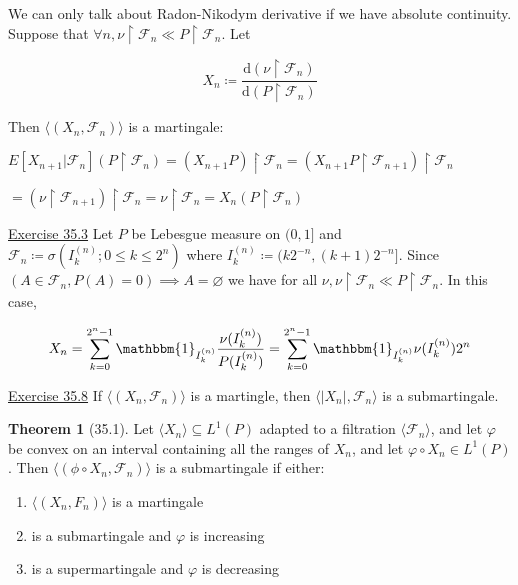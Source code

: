 \documentclass{article}
\theoremstyle{definition}
\newtheorem{theorem}{Theorem}
\begin{document}
We can only talk about Radon-Nikodym derivative if we have absolute continuity. Suppose that \(\forall n, \nu \upharpoonright \mathscr{F}_n \ll P\upharpoonright \mathscr{F}_n\). Let

\[
    X_n \coloneqq \frac{\mathrm{d} (\nu \upharpoonright \mathscr{F}_n)}{\mathrm{d}(P\upharpoonright \mathscr{F}_n)}
\]

Then \(\langle (X_n, \mathscr{F}_n) \rangle \)  is a martingale:

\(E[X_{n+1}|\mathscr{F}_n](P\upharpoonright \mathscr{F}_n)=(X_{n+1}P)\upharpoonright \mathscr{F}_n=(X_{n+1}P\upharpoonright \mathscr{F}_{n+1})\upharpoonright \mathscr{F}_n\) 

\(=(\nu\upharpoonright \mathscr{F}_{n+1})\upharpoonright \mathscr{F}_n = \nu\upharpoonright \mathscr{F}_n = X_n(P\upharpoonright \mathscr{F}_n)\) 

\underline{Exercise 35.3} Let \(P\) be Lebesgue measure on \((0,1]\) and \(\mathscr{F}_n\coloneqq \sigma(I_k^{(n)};0 \leq k \leq 2^n)\) where \(I_k^{(n)}\coloneqq (k2^{-n},(k+1)2^{-n}]\). Since \((A\in \mathscr{F}_n, P(A)=0) \implies A = \varnothing\) we have for all \(\nu, \nu \upharpoonright \mathscr{F}_n \ll P\upharpoonright \mathscr{F}_n\). In this case,

\[
    X_n = \sum_{k=0}^{2^n - 1} \mathbbm{1}_{I_k^{(n)}} \frac{\nu(I_k^{(n)})}{P(I_k^{(n)})} = \sum_{k=0}^{2^n - 1} \mathbbm{1}_{I_k^{(n)}} \nu(I_k^{(n)}) 2^n
\]

\underline{Exercise 35.8} If \(\langle (X_n, \mathscr{F}_n) \rangle \) is a martingle, then \(\langle \vert X_n \vert , \mathscr{F}_n \rangle \) is a submartingale.

\begin{theorem}
    [35.1] Let \(\langle X_n \rangle \subseteq L^1(P)\) adapted to a filtration \(\langle \mathscr{F} _n \rangle \), and let \(\varphi\) be convex on an interval containing all the ranges of \(X_n\), and let \(\varphi \circ X_n\in L^1(P)\). Then \(\langle (\phi \circ X_n, \mathscr{F}_n) \rangle \) is a submartingale if either:

    \begin{enumerate}
        \item \(\langle (X_n, F_n) \rangle \) is a martingale
        \item is a submartingale and \(\varphi\) is increasing
        \item is a supermartingale and \(\varphi\) is decreasing   
    \end{enumerate}
\end{theorem}
\end{document}
